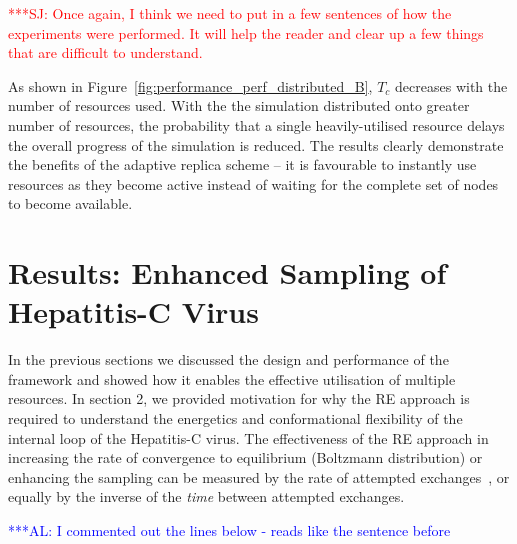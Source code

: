 \documentclass{rspublic}
\newcommand{\alnote}[1]{ {\textcolor{blue} { ***AL: #1 }}}
\newcommand{\jhanote}[1]{ {\textcolor{red} { ***SJ: #1 }}}
\newcommand{\alnote}[1]{}
\newcommand{\jhanote}[1]{}
\begin{document}
\jhanote{Once again, I think we need to put in a few sentences of how
  the experiments were performed. It will help the reader and clear up
  a few things that are difficult to understand.}

As shown in Figure~\ref{fig:performance_perf_distributed_B}, $T_{c}$
decreases with the number of resources used.  With the the simulation
distributed onto greater number of resources, the probability that a
single heavily-utilised resource delays the overall progress of the
simulation is reduced.
The results clearly demonstrate the benefits of the adaptive replica
scheme -- it is favourable to instantly use resources as they become
active instead of waiting for the complete set of nodes to become
available.  

\section{Results: Enhanced Sampling of Hepatitis-C Virus}
In the previous sections we discussed the design and performance of
the framework and showed how it enables the effective utilisation of
multiple resources. In section 2, we provided motivation for why the
RE approach is required to understand the energetics and
conformational flexibility of the internal loop of the Hepatitis-C
virus. The effectiveness of the RE approach in increasing the rate of
convergence to equilibrium (Boltzmann distribution) or enhancing the
sampling can be measured by the rate of attempted
exchanges~\citep{Lei:2007xe}, or equally by the inverse of the {\it
  time} between attempted exchanges.

\alnote{I commented out the lines below - reads like the sentence before}
\end{document}
